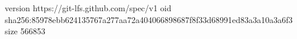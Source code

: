 version https://git-lfs.github.com/spec/v1
oid sha256:85978ebb624135767a277aa72a404066898687f8f33d68991ed83a3a10a3a6f3
size 566853
